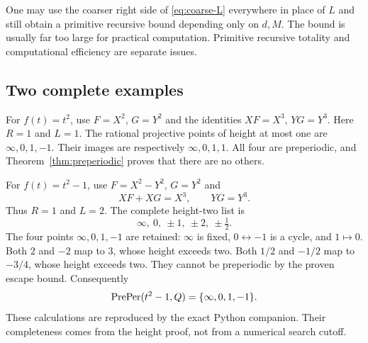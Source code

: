 One may use the coarser right side of \eqref{eq:coarse-L} everywhere in
place of $L$ and still obtain a primitive recursive bound depending only
on $d,M$. The bound is usually far too large for practical computation.
Primitive recursive totality and computational efficiency are separate issues.

\subsection{Two complete examples}

For $f(t)=t^2$, use $F=X^2$, $G=Y^2$ and the identities
$XF=X^3$, $YG=Y^3$. Here $R=1$ and $L=1$.
The rational projective points of height at most one are
$\infty,0,1,-1$. Their images are respectively $\infty,0,1,1$.
All four are preperiodic, and Theorem~\ref{thm:preperiodic} proves that
there are no others.

For $f(t)=t^2-1$, use $F=X^2-Y^2$, $G=Y^2$ and
\[
                 XF+XG=X^3,\qquad YG=Y^3.
\]
Thus $R=1$ and $L=2$. The complete height-two list is
\[
             \infty,\ 0,\ \pm1,\ \pm2,\ \pm\tfrac12.
\]
The four points $\infty,0,1,-1$ are retained: $\infty$ is fixed,
$0\leftrightarrow-1$ is a cycle, and $1\mapsto0$.
Both $2$ and $-2$ map to $3$, whose height exceeds two. Both
$1/2$ and $-1/2$ map to $-3/4$, whose height exceeds two.
They cannot be preperiodic by the proven escape bound. Consequently
\[
          \operatorname{PrePer}(t^2-1,Q)=\{\infty,0,1,-1\}.
\]
These calculations are reproduced by the exact Python companion. Their
completeness comes from the height proof, not from a numerical search cutoff.

